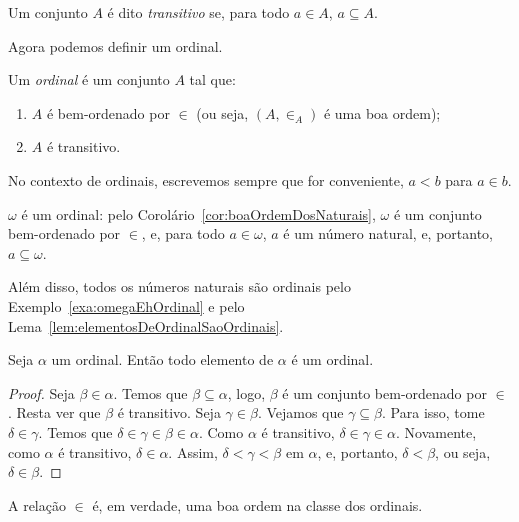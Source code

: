 \begin{definition}[$\BST$]\label{def:conjuntoTransitivo}
    Um conjunto $A$ é dito \emph{transitivo} se, para todo $a\in A$, $a\subseteq A$.
\end{definition}

Agora podemos definir um ordinal.

\begin{definition}[$\BST$]\label{def:ordinal}
    Um \emph{ordinal} é um conjunto $A$ tal que:
    \begin{enumerate}[label=(\alph*)]
        \item $A$ é bem-ordenado por $\in$ (ou seja, $(A, \in_A)$ é uma boa ordem);
        \item $A$ é transitivo.
    \end{enumerate}
\end{definition}
No contexto de ordinais, escrevemos sempre que for conveniente, $a<b$ para $a\in b$.

\begin{example}[$\BSTI$]\label{exa:omegaEhOrdinal}
    $\omega$ é um ordinal: pelo Corolário~\ref{cor:boaOrdemDosNaturais}, $\omega$ é um conjunto bem-ordenado por $\in$, e, para todo $a\in \omega$, $a$ é um número natural, e, portanto, $a\subseteq \omega$.
\end{example}

Além disso, todos os números naturais são ordinais pelo Exemplo~\ref{exa:omegaEhOrdinal} e pelo Lema~\ref{lem:elementosDeOrdinalSaoOrdinais}.

\begin{lemma}[$\BST$]\label{lem:elementosDeOrdinalSaoOrdinais}
    Seja $\alpha$ um ordinal.
    Então todo elemento de $\alpha$ é um ordinal.
\end{lemma}
\begin{proof}
Seja $\beta \in \alpha$.
Temos que $\beta\subseteq \alpha$, logo, $\beta$ é um conjunto bem-ordenado por $\in$.
Resta ver que $\beta$ é transitivo.
Seja $\gamma \in \beta$.
Vejamos que $\gamma\subseteq \beta$.
Para isso, tome $\delta \in \gamma$.
Temos que $\delta \in \gamma \in \beta \in \alpha$.
Como $\alpha$ é transitivo, $\delta \in \gamma \in \alpha$.
Novamente, como $\alpha$ é transitivo, $\delta \in \alpha$.
Assim, $\delta<\gamma<\beta$ em $\alpha$, e, portanto, $\delta <\beta$, ou seja, $\delta \in \beta$.
\end{proof}

A relação $\in$ é, em verdade, uma boa ordem na classe dos ordinais.

